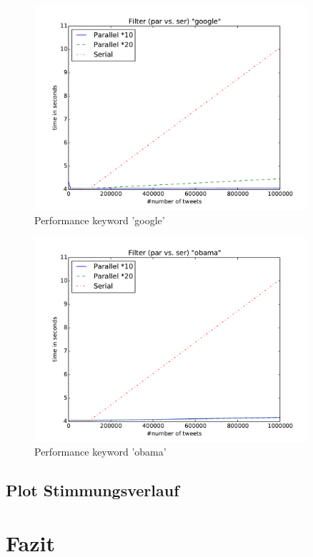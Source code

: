 \documentclass[12pt, oneside]{report}   	%
\begin{document}
\begin{figure}[htbp]
\begin{center}
\includegraphics[width=0.9\textwidth]{bilder/time_filter_google.pdf}
\caption{Performance keyword 'google'}
\label{img:performancefilter2}
\end{center}
\end{figure}

\begin{figure}[htbp]
\begin{center}
\includegraphics[width=0.9\textwidth]{bilder/time_filter_obama.pdf}
\caption{Performance keyword 'obama'}
\label{img:performancefilter3}
\end{center}
\end{figure}



\section{Plot Stimmungsverlauf}


\chapter{Fazit}
\end{document}
